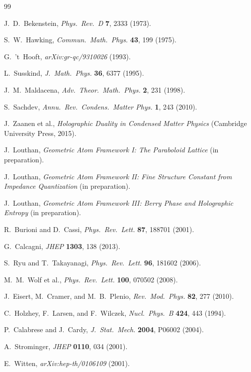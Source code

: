 \documentclass[aps,prl,twocolumn,showpacs,superscriptaddress,groupedaddress]{revtex4-2}
\begin{document}
\begin{thebibliography}{99}

 J.~D.~Bekenstein, \emph{Phys.\ Rev.\ D} \textbf{7}, 2333 (1973).

 S.~W.~Hawking, \emph{Commun.\ Math.\ Phys.} \textbf{43}, 199 (1975).

 G.~'t~Hooft, \emph{arXiv:gr-qc/9310026} (1993).

 L.~Susskind, \emph{J.\ Math.\ Phys.} \textbf{36}, 6377 (1995).

 J.~M.~Maldacena, \emph{Adv.\ Theor.\ Math.\ Phys.} \textbf{2}, 231 (1998).

 S.~Sachdev, \emph{Annu.\ Rev.\ Condens.\ Matter Phys.} \textbf{1}, 243 (2010).

 J.~Zaanen et al., \emph{Holographic Duality in Condensed Matter Physics} (Cambridge University Press, 2015).

 J.~Louthan, \emph{Geometric Atom Framework I: The Paraboloid Lattice} (in preparation).

 J.~Louthan, \emph{Geometric Atom Framework II: Fine Structure Constant from Impedance Quantization} (in preparation).

 J.~Louthan, \emph{Geometric Atom Framework III: Berry Phase and Holographic Entropy} (in preparation).

 R.~Burioni and D.~Cassi, \emph{Phys.\ Rev.\ Lett.} \textbf{87}, 188701 (2001).

 G.~Calcagni, \emph{JHEP} \textbf{1303}, 138 (2013).

 S.~Ryu and T.~Takayanagi, \emph{Phys.\ Rev.\ Lett.} \textbf{96}, 181602 (2006).

 M.~M.~Wolf et al., \emph{Phys.\ Rev.\ Lett.} \textbf{100}, 070502 (2008).

 J.~Eisert, M.~Cramer, and M.~B.~Plenio, \emph{Rev.\ Mod.\ Phys.} \textbf{82}, 277 (2010).

 C.~Holzhey, F.~Larsen, and F.~Wilczek, \emph{Nucl.\ Phys.\ B} \textbf{424}, 443 (1994).

 P.~Calabrese and J.~Cardy, \emph{J.\ Stat.\ Mech.} \textbf{2004}, P06002 (2004).

 A.~Strominger, \emph{JHEP} \textbf{0110}, 034 (2001).

 E.~Witten, \emph{arXiv:hep-th/0106109} (2001).

\end{thebibliography}
\end{document}
